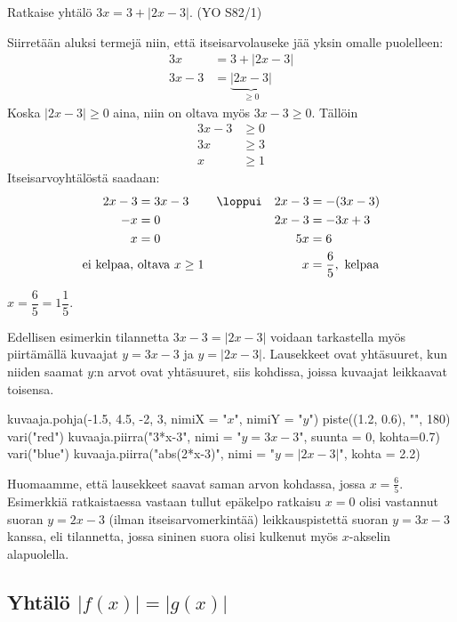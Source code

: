 \begin{esimerkki}
	Ratkaise yhtälö $3x=3+|2x-3|$. (YO S82/1)
	\begin{esimratk}
		Siirretään aluksi termejä niin, että itseisarvolauseke jää yksin omalle puolelleen:
		\begin{align*}
			3x & =3+|2x-3|  \\
			3x-3 & =\underbrace{|2x-3|}_{\geq 0}
		\end{align*}
		Koska $|2x-3|\geq0$ aina, niin on oltava myös $3x-3\geq0$. Tällöin
		\begin{align*}
			3x-3&\geq0 \\
			3x&\geq3 \\
			x&\geq1
		\end{align*}
		Itseisarvoyhtälöstä saadaan:
		\begin{align*}
			2x-3&=3x-3   & &\loppui & 2x-3 & =-(3x-3) \\
			-x&=0        && & 2x-3&=-3x+3 \\
			x&=0         && & 5x&=6 \\
			\text{ei kelpaa, } & \text{oltava $x\geq1$}  && & x&=\frac{6}{5}, \text{ kelpaa}
		\end{align*}
	\end{esimratk}
	\begin{esimvast}
		$x=\dfrac{6}{5}=1\dfrac{1}{5}$.
	\end{esimvast}
\end{esimerkki}

Edellisen esimerkin tilannetta $3x-3=|2x-3|$ voidaan tarkastella myös piirtämällä kuvaajat $y=3x-3$ ja $y=|2x-3|$. Lausekkeet ovat yhtäsuuret, kun niiden saamat $y$:n arvot ovat yhtäsuuret, siis kohdissa, joissa kuvaajat leikkaavat toisensa.

\begin{kuva}
    kuvaaja.pohja(-1.5, 4.5, -2, 3, nimiX = "$x$", nimiY = "$y$")
    piste((1.2, 0.6), "", 180)
    vari("red")
    kuvaaja.piirra("3*x-3", nimi = "$y=3x - 3$", suunta = 0, kohta=0.7)
    vari("blue")
    kuvaaja.piirra("abs(2*x-3)", nimi = "$y=|2x - 3|$", kohta = 2.2)
\end{kuva}

Huomaamme, että lausekkeet saavat saman arvon kohdassa, jossa \mbox{$x=\frac{6}{5}$}. Esimerkkiä ratkaistaessa vastaan tullut epäkelpo ratkaisu $x=0$ olisi vastannut suoran $y=2x-3$ (ilman itseisarvomerkintää) leikkauspistettä suoran $y=3x-3$ kanssa, eli tilannetta, jossa sininen suora olisi kulkenut myös $x$-akselin alapuolella.

\subsection*{Yhtälö $|f(x)|=|g(x)|$}

